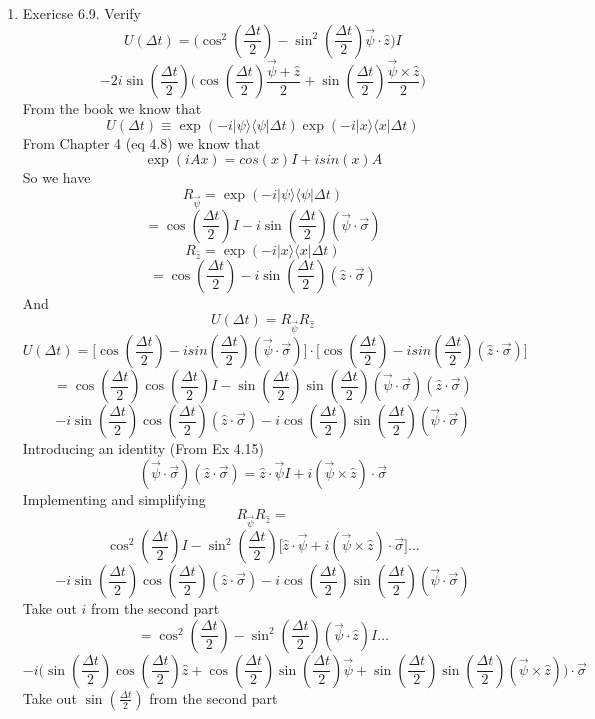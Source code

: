 \documentclass[12pt]{article}
\newcommand{\ket}[1]{\vert{#1}\rangle}
\newcommand{\bra}[1]{\langle{#1}\vert}
\begin{document}
\begin{enumerate}
    \item Exericse 6.9. Verify 
    $$ U (\Delta t) = \Big( \cos^2(\frac{\Delta t}{2}) - \sin^2(\frac{\Delta t}{2}) \vec{\psi} \cdot \hat{z} \Big) I $$
    $$ - 2i \sin(\frac{\Delta t}{2})\Big( \cos(\frac{\Delta t}{2}) \frac{\vec{\psi}+\hat{z}}{2} + \sin(\frac{\Delta t}{2}) \frac{\vec{\psi} \times \hat{z}}{2} \Big) $$
    From the book we know that 
    $$ U(\Delta t) \equiv \exp(-i \ket{\psi}\bra{\psi} \Delta t) \exp(-i \ket{x}\bra{x} \Delta t) $$
    From Chapter 4 (eq 4.8) we know that 
    $$ \exp(i Ax) = cos(x) I + isin(x)A $$ 
    So we have 
    $$ R_{\vec{\psi}} = \exp(-i \ket{\psi}\bra{\psi} \Delta t) $$
    $$ = \cos(\frac{\Delta t}{2})I -i \sin(\frac{\Delta t}{2})(\vec{\psi} \cdot \vec{\sigma}) $$
    $$ R_{\hat{z}} =  \exp(-i \ket{x}\bra{x} \Delta t) $$
    $$ = \cos(\frac{\Delta t}{2}) - i \sin(\frac{\Delta t}{2}) (\hat{z} \cdot \vec{\sigma}) $$
    And 
    $$ U(\Delta t) = R_{\vec{\psi}} R_{\hat{z}} $$
    $$ U(\Delta t) = \Big[ \cos(\frac{\Delta t}{2}) -isin(\frac{\Delta t}{2})(\vec{\psi} \cdot \vec{\sigma}) \Big] \cdot \Big[ \cos(\frac{\Delta t}{2}) -isin(\frac{\Delta t}{2})(\hat{z} \cdot \vec{\sigma}) \Big] $$
    $$ = \cos(\frac{\Delta t}{2}) \cos(\frac{\Delta t}{2})I - \sin(\frac{\Delta t}{2}) \sin(\frac{\Delta t}{2})(\vec{\psi} \cdot \vec{\sigma})(\hat{z} \cdot \vec{\sigma}) $$ 
    $$ -i \sin(\frac{\Delta t}{2}) \cos(\frac{\Delta t}{2})(\hat{z} \cdot \vec{\sigma}) -i \cos(\frac{\Delta t}{2}) \sin(\frac{\Delta t}{2}) (\vec{\psi} \cdot \vec{\sigma}) $$
    Introducing an identity (From Ex 4.15)
    $$ (\vec{\psi} \cdot \vec{\sigma})(\hat{z} \cdot \vec{\sigma}) = \hat{z} \cdot \vec{\psi}I + i(\vec{\psi} \times \hat{z}) \cdot \vec{\sigma} $$
    Implementing and simplifying 
    $$ R_{\vec{\psi}} R_{\hat{z}}  = $$
    $$ \cos^2 (\frac{\Delta t}{2})I - \sin^2(\frac{\Delta t}{2}) \Big[ \hat{z} \cdot \vec{\psi} + i(\vec{\psi} \times \hat{z}) \cdot \vec{\sigma} \Big] \ldots $$
    $$ -i \sin(\frac{\Delta t}{2}) \cos(\frac{\Delta t}{2})(\hat{z} \cdot \vec{\sigma}) -i \cos(\frac{\Delta t}{2}) \sin(\frac{\Delta t}{2}) (\vec{\psi} \cdot \vec{\sigma}) $$
    Take out $i$ from the second part 
    $$ =  \cos^2 (\frac{\Delta t}{2}) - \sin^2(\frac{\Delta t}{2})(\vec{\psi} \cdot \hat{z})I \ldots $$
    $$ -i \Big(\sin(\frac{\Delta t}{2}) \cos(\frac{\Delta t}{2}) \hat{z} + \cos(\frac{\Delta t}{2}) \sin(\frac{\Delta t}{2}) \vec{\psi} + \sin(\frac{\Delta t}{2}) \sin(\frac{\Delta t}{2}) (\vec{\psi} \times \hat{z}) \Big) \cdot \vec{\sigma}$$
    Take out $\sin(\frac{\Delta t}{2})$ from the second part 

\end{enumerate}
\end{document}
